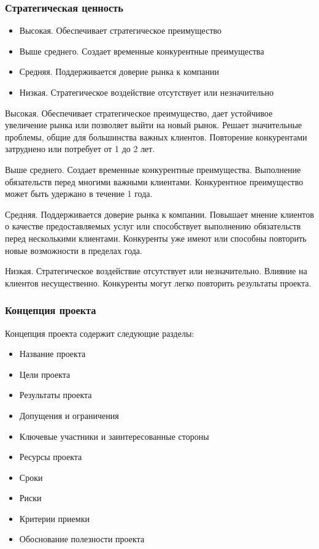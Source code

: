 \documentclass{../industrial-development}
\begin{document}
    \begin{frame} \frametitle{Стратегическая ценность}
	\begin{itemize}
		\item Высокая. Обеспечивает стратегическое преимущество
		\item Выше среднего. Создает временные конкурентные преимущества
		\item Средняя. Поддерживается доверие рынка к компании
		\item Низкая. Стратегическое воздействие отсутствует или незначительно
	\end{itemize}
    \end{frame}
    \lecturenotes

Высокая. Обеспечивает стратегическое преимущество, дает устойчивое увеличение рынка или позволяет выйти на новый рынок. Решает значительные проблемы, общие для большинства важных клиентов. Повторение конкурентами затруднено или потребует от 1 до 2 лет.

Выше среднего. Создает временные конкурентные преимущества. Выполнение обязательств перед многими важными клиентами. Конкурентное преимущество может быть удержано в течение 1 года.

Средняя. Поддерживается доверие рынка к компании. Повышает мнение клиентов о качестве предоставляемых услуг или способствует выполнению обязательств перед несколькими клиентами. Конкуренты уже имеют или способны повторить новые возможности в пределах года.

Низкая. Стратегическое воздействие отсутствует или незначительно. Влияние на клиентов несущественно. Конкуренты могут легко повторить результаты проекта.

    \begin{frame} \frametitle{Концепция проекта}
	Концепция проекта содержит следующие разделы:
	\begin{itemize}
		\item Название проекта
		\item Цели проекта
		\item Результаты проекта
		\item Допущения и ограничения
		\item Ключевые участники и заинтересованные стороны
		\item Ресурсы проекта
		\item Сроки
		\item Риски
		\item Критерии приемки
		\item Обоснование полезности проекта
	\end{itemize}
    \end{frame}
    \lecturenotes
\end{document}
